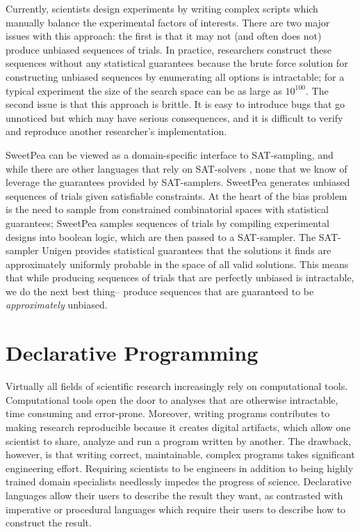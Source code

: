 Currently, scientists design experiments by writing complex scripts which manually balance the experimental factors of interests. There are two major issues with this approach: the first is that it may not (and often does not) produce unbiased sequences of trials. In practice, researchers construct these sequences without any statistical guarantees because the brute force solution for constructing unbiased sequences by enumerating all options is intractable; for a typical experiment the size of the search space can be as large as $10^{100}$. The second issue is that this approach is brittle. It is easy to introduce bugs that go unnoticed but which may have serious consequences, and it is difficult to verify and reproduce another researcher's implementation.

SweetPea can be viewed as a domain-specific interface to SAT-sampling, and while there are other languages that rely on SAT-solvers \cite{torlak2014lightweight}, none that we know of leverage the guarantees provided by SAT-samplers. SweetPea generates unbiased sequences of trials given satisfiable constraints. At the heart of the bias problem is the need to sample from constrained combinatorial spaces with statistical guarantees; SweetPea samples sequences of trials by compiling experimental designs into boolean logic, which are then passed to a SAT-sampler. The SAT-sampler Unigen \cite{meel2016constrained}
provides statistical guarantees that the solutions it finds are approximately uniformly probable in the space of all valid solutions. This means that while producing sequences of trials that are perfectly unbiased is intractable, we do the next best thing-- produce sequences that are guaranteed to be \emph{approximately} unbiased.

\section{Declarative Programming}

Virtually all fields of scientific research increasingly rely on computational tools. Computational tools open the door to analyses that are otherwise intractable, time consuming and error-prone. Moreover, writing programs contributes to making research reproducible because it creates digital artifacts, which allow one scientist to share, analyze and run a program written by another. The drawback, however, is that writing correct, maintainable, complex programs takes significant engineering effort. Requiring scientists to be engineers in addition to being highly trained domain specialists needlessly impedes the progress of science. Declarative languages allow their users to describe the result they want, as contrasted with imperative or procedural languages which require their users to describe how to construct the result.

